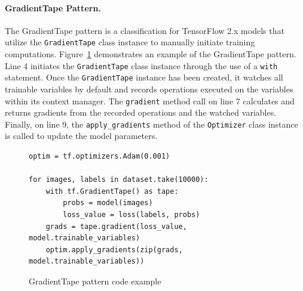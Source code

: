 \vspace{-1em} 

\paragraph{GradientTape Pattern.}
The GradientTape pattern is a classification for TensorFlow 2.x models that
utilize the {\tt GradientTape} class instance to manually initiate training
computations. 
Figure~\ref{fig:tapepattern} demonstrates an example of the
GradientTape pattern. 
Line 4 initiates the {\tt GradientTape} class instance through the use of a
{\tt with} statement. 
Once the {\tt GradientTape} instance has been created, it watches all trainable
variables by default and records operations executed on the variables within
its context manager.
The {\tt gradient} method call on line 7 calculates and returns gradients from
the recorded operations and the watched variables. 
Finally, on line 9, the {\tt apply\_gradients} method of the {\tt Optimizer}
class instance is called to update the model parameters.

\vspace{-1em} 

\begin{figure}[!ht]
  \begin{lstlisting}[style=mpython]
optim = tf.optimizers.Adam(0.001)

for images, labels in dataset.take(10000):
    with tf.GradientTape() as tape:
        probs = model(images)
        loss_value = loss(labels, probs)
    grads = tape.gradient(loss_value, model.trainable_variables)
    optim.apply_gradients(zip(grads, model.trainable_variables))\end{lstlisting}
  \caption{GradientTape pattern code example}
  \label{fig:tapepattern}
\end{figure}

